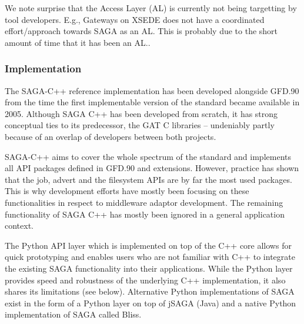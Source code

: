 \documentclass{article}
\begin{document}
  We note surprise that the Access Layer (AL) is currently not being
  targetting by tool developers. E.g., Gateways on XSEDE does not have
  a coordinated effort/approach towards SAGA as an AL. This is
  probably due to the short amount of time that it has been an AL..

  \subsubsection{Implementation}

   The SAGA-C++ reference implementation has been developed alongside
   GFD.90 from the time the first implementable version of the standard
   became available in 2005. Although SAGA C++ has been developed from
   scratch, it has strong conceptual ties to its predecessor, the GAT
   C libraries -- undeniably partly because of an overlap of developers
   between both projects.

   SAGA-C++ aims to cover the whole spectrum of the standard and
   implements all API packages defined in GFD.90 and extensions.
   However, practice has shown that the job, advert and the filesystem
   APIs are by far the most used packages.  
   This is why development efforts have mostly been focusing
   on these functionalities in respect to middleware adaptor
   development. The remaining functionality of SAGA C++ has mostly 
   been ignored in a general application context.
     
   The Python API layer which is implemented on top of the C++ core
   allows for quick prototyping and enables users who are not familiar
   with C++ to integrate the existing SAGA functionality into their
   applications. While the Python layer provides speed and robustness 
   of the underlying C++ implementation, it also shares its limitations
   (see below). Alternative Python implementations of SAGA exist in 
   the form of a Python layer on top of jSAGA (Java) and a native Python
   implementation of SAGA called Bliss\cite{bliss_web}.

   
  
\end{document}
